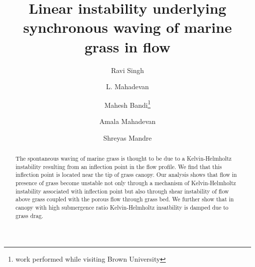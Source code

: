 \documentclass[aps,prl,reprint,twocolumn,showpacs,superscriptaddress,10pt]{revtex4-1}  %
\begin{document}
\title{Linear instability underlying synchronous waving of marine grass in flow}
\author{Ravi Singh}
\author{L. Mahadevan}
\author{Mahesh Bandi\thanks{work performed while visiting Brown University}}
\author{Amala Mahadevan}
\author{Shreyas Mandre}

\begin{abstract}


The spontaneous waving of marine grass is thought to be due to a Kelvin-Helmholtz instability resulting from an inflection point in the flow profile. We find that this inflection point
is located near the tip of grass canopy. Our analysis shows that flow in presence of grass become unstable not only through a mechanism of Kelvin-Helmholtz instability associated with 
inflection point but also through shear instability of flow above grass coupled with the porous flow through grass bed. We further show that in canopy with high submergence ratio
Kelvin-Helmholtz insatbility is damped due to grass drag. 

\end{abstract}
\maketitle
\end{document}
